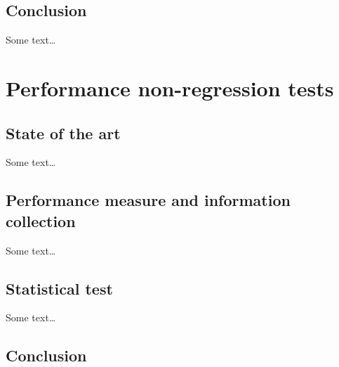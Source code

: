 	\section{Conclusion}
        Some text\dots


\chapter{Performance non-regression tests}%
\label{chapter:experiment:tests}

    \section{State of the art}%
        Some text\dots

    \section{Performance measure and information collection}%
    \label{sec:performance_measure_and_information_collection}
        Some text\dots

    \section{Statistical test}%
    \label{sec:statistical_test}
        Some text\dots

    \section{Conclusion}%
    \label{sec:conclusion}
